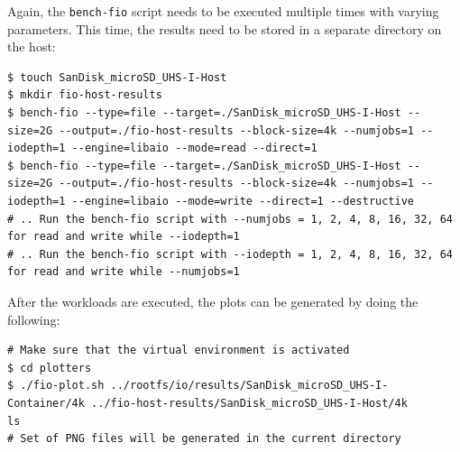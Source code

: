 Again, the \verb|bench-fio| script needs to be executed multiple times with varying parameters.
This time, the results need to be stored in a separate directory on the host: 
\begin{lstlisting}[label={code:implementation/benchmark/io-run}, style=bash, caption={}]
$ touch SanDisk_microSD_UHS-I-Host
$ mkdir fio-host-results
$ bench-fio --type=file --target=./SanDisk_microSD_UHS-I-Host --size=2G --output=./fio-host-results --block-size=4k --numjobs=1 --iodepth=1 --engine=libaio --mode=read --direct=1 
$ bench-fio --type=file --target=./SanDisk_microSD_UHS-I-Host --size=2G --output=./fio-host-results --block-size=4k --numjobs=1 --iodepth=1 --engine=libaio --mode=write --direct=1 --destructive 
# .. Run the bench-fio script with --numjobs = 1, 2, 4, 8, 16, 32, 64 for read and write while --iodepth=1
# .. Run the bench-fio script with --iodepth = 1, 2, 4, 8, 16, 32, 64 for read and write while --numjobs=1
\end{lstlisting}

After the workloads are executed, the plots can be generated by doing the following:
\begin{lstlisting}[label={code:implementation/benchmark/io-run}, style=bash, caption={}]
# Make sure that the virtual environment is activated 
$ cd plotters 
$ ./fio-plot.sh ../rootfs/io/results/SanDisk_microSD_UHS-I-Container/4k ../fio-host-results/SanDisk_microSD_UHS-I-Host/4k
ls 
# Set of PNG files will be generated in the current directory
\end{lstlisting}
